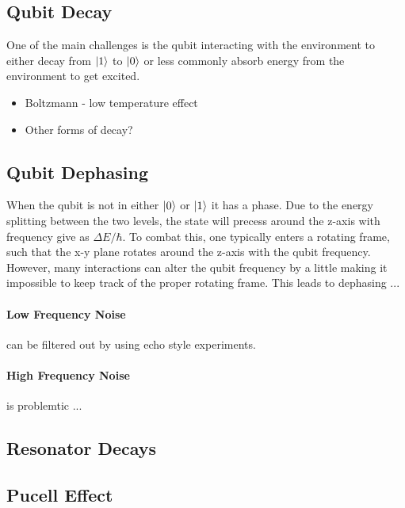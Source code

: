 \subsection{Qubit Decay}
One of the main challenges is the qubit interacting with the environment to either decay from $\ket{1}$ to $\ket{0}$ or less commonly absorb energy from the environment to get excited. 
\begin{itemize}
    \item Boltzmann - low temperature effect
    \item Other forms of decay?
\end{itemize}

\subsection{Qubit Dephasing}
When the qubit is not in either $\ket{0}$ or $\ket{1}$ it has a phase. Due to the energy splitting between the two levels, the state will precess around the z-axis with frequency give as $\Delta E / \hbar$. To combat this, one typically enters a rotating frame, such that the x-y plane rotates around the z-axis with the qubit frequency. However, many interactions can alter the qubit frequency by a little making it impossible to keep track of the proper rotating frame. This leads to dephasing ... 

\paragraph{Low Frequency Noise} can be filtered out by using echo style experiments.

\paragraph{High Frequency Noise} is problemtic ...  

\subsection{Resonator Decays}

\subsection{Pucell Effect}

